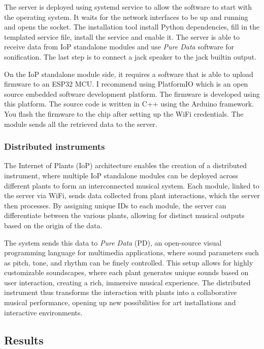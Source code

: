 The server is deployed using systemd service to allow the software to start with the operating system.
It waits for the network interfaces to be up and running and opens the socket.
The installation tool install Python dependencies, fill in the templated service file,
install the service and enable it. The server is able to receive data from IoP standalone
modules and use \textit{Pure Data} software for sonification. The last step is to connect
a jack speaker to the jack builtin output.

On the IoP standalone module side, it requires a software that is able to upload
firmware to an ESP32 MCU. I recommend using PlatformIO which is an open source
embedded software development platform. The firmware is developed using this platform.
The source code is written in C++ using the Arduino framework. You flash the firmware
to the chip after setting up the WiFi credentials.
The module sends all the retrieved data to the server.

\subsubsection{Distributed instruments}

The Internet of Plants (IoP) architecture enables the creation of a distributed instrument, where multiple IoP standalone modules can be deployed across different plants to form an interconnected musical system. Each module, linked to the server via WiFi, sends data collected from plant interactions, which the server then processes. By assigning unique IDs to each module, the server can differentiate between the various plants, allowing for distinct musical outputs based on the origin of the data.

The system sends this data to \textit{Pure Data} (PD), an open-source visual programming language for multimedia applications, where sound parameters such as pitch, tone, and rhythm can be finely controlled. This setup allows for highly customizable soundscapes, where each plant generates unique sounds based on user interaction, creating a rich, immersive musical experience. The distributed instrument thus transforms the interaction with plants into a collaborative musical performance, opening up new possibilities for art installations and interactive environments.

\subsection{Results}

